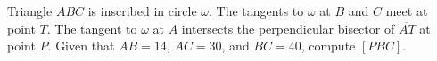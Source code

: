 Triangle $ABC$ is inscribed in circle $\omega$. The tangents to $\omega$ at $B$ and $C$ meet at point $T$. The tangent to $\omega$ at $A$ intersects the perpendicular bisector of $\overline{AT}$ at point $P$. Given that $AB=14$, $AC=30$, and $BC=40$, compute $[PBC]$.